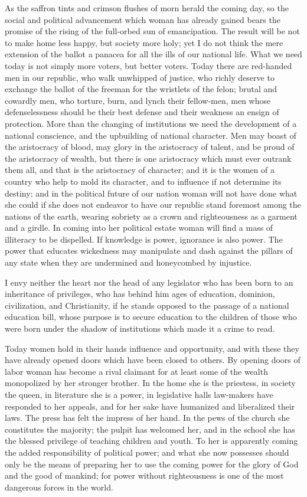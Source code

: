 \documentclass{article}
\begin{document}
As the saffron tints and crimson flushes of morn herald the coming day, so the
social and political advancement which woman has already gained bears the
promise of the rising of the full-orbed sun of emancipation. The result will be
not to make home less happy, but society more holy; yet I do not think the mere
extension of the ballot a panacea for all the ills of our national life. What
we need today is not simply more voters, but better voters. Today there are
red-handed men in our republic, who walk unwhipped of justice, who richly
deserve to exchange the ballot of the freeman for the wristlets of the felon;
brutal and cowardly men, who torture, burn, and lynch their fellow-men, men
whose defenselessness should be their best defense and their weakness an ensign
of protection. More than the changing of institutions we need the development
of a national conscience, and the upbuilding of national character. Men may
boast of the aristocracy of blood, may glory in the aristocracy of talent, and
be proud of the aristocracy of wealth, but there is one aristocracy which must
ever outrank them all, and that is the aristocracy of character; and it is the
women of a country who help to mold its character, and to influence if not
determine its destiny; and in the political future of our nation woman will not
have done what she could if she does not endeavor to have our republic stand
foremost among the nations of the earth, wearing sobriety as a crown and
righteousness as a garment and a girdle. In coming into her political estate
woman will find a mass of illiteracy to be dispelled. If knowledge is power,
ignorance is also power. The power that educates wickedness may manipulate and
dash against the pillars of any state when they are undermined and honeycombed
by injustice.

I envy neither the heart nor the head of any legislator who has been born to an
inheritance of privileges, who has behind him ages of education, dominion,
civilization, and Christianity, if he stands opposed to the passage of a
national education bill, whose purpose is to secure education to the children
of those who were born under the shadow of institutions which made it a crime
to read.

Today women hold in their hands influence and opportunity, and with these they
have already opened doors which have been closed to others. By opening doors of
labor woman has become a rival claimant for at least some of the wealth
monopolized by her stronger brother. In the home she is the priestess, in
society the queen, in literature she is a power, in legislative halls
law-makers have responded to her appeals, and for her sake have humanized and
liberalized their laws. The press has felt the impress of her hand. In the pews
of the church she constitutes the majority; the pulpit has welcomed her, and in
the school she has the blessed privilege of teaching children and youth. To her
is apparently coming the added responsibility of political power; and what she
now possesses should only be the means of preparing her to use the coming power
for the glory of God and the good of mankind; for power without righteousness
is one of the most dangerous forces in the world.
\end{document}
